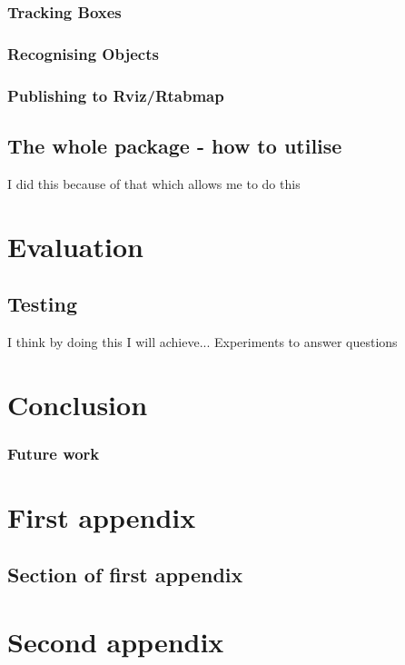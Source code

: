 \documentclass{mproj}
\begin{document}
\subsection{Tracking Boxes}
\subsection{Recognising Objects}
\subsection{Publishing to Rviz/Rtabmap}
\section{The whole package - how to utilise}

I did this because of that which allows me to do this

\chapter{Evaluation}
\section{Testing}

I think by doing this I will achieve...
Experiments to answer questions

\chapter{Conclusion}\label{conclusion}
\subsection{Future work}

\appendix %
\chapter{First appendix}

\section{Section of first appendix}

\chapter{Second appendix}



\end{document}
